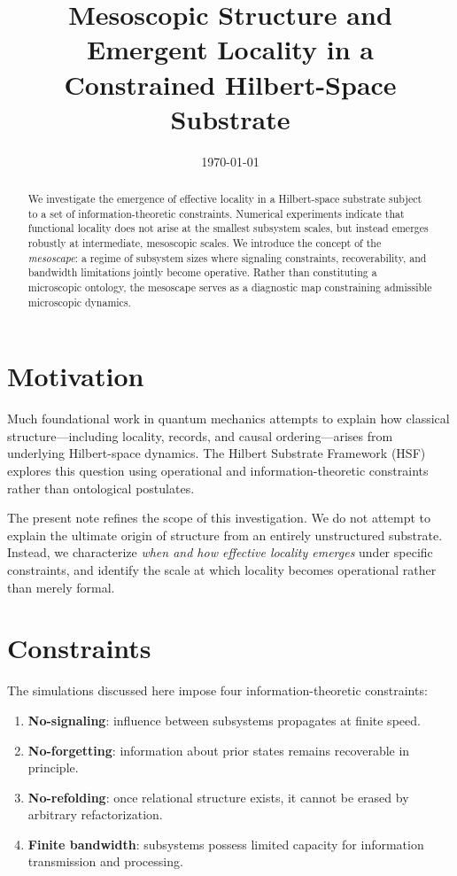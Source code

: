 \documentclass[11pt]{article}
\title{Mesoscopic Structure and Emergent Locality in a Constrained Hilbert-Space Substrate}
\author{ }
\date{\today}
\begin{document}
\maketitle

\begin{abstract}
We investigate the emergence of effective locality in a Hilbert-space substrate subject to a set of information-theoretic constraints. Numerical experiments indicate that functional locality does not arise at the smallest subsystem scales, but instead emerges robustly at intermediate, mesoscopic scales. We introduce the concept of the \emph{mesoscape}: a regime of subsystem sizes where signaling constraints, recoverability, and bandwidth limitations jointly become operative. Rather than constituting a microscopic ontology, the mesoscape serves as a diagnostic map constraining admissible microscopic dynamics.
\end{abstract}

\section{Motivation}

Much foundational work in quantum mechanics attempts to explain how classical structure---including locality, records, and causal ordering---arises from underlying Hilbert-space dynamics. The Hilbert Substrate Framework (HSF) explores this question using operational and information-theoretic constraints rather than ontological postulates.

The present note refines the scope of this investigation. We do not attempt to explain the ultimate origin of structure from an entirely unstructured substrate. Instead, we characterize \emph{when and how effective locality emerges} under specific constraints, and identify the scale at which locality becomes operational rather than merely formal.

\section{Constraints}

The simulations discussed here impose four information-theoretic constraints:

\begin{enumerate}
    \item \textbf{No-signaling}: influence between subsystems propagates at finite speed.
    \item \textbf{No-forgetting}: information about prior states remains recoverable in principle.
    \item \textbf{No-refolding}: once relational structure exists, it cannot be erased by arbitrary refactorization.
    \item \textbf{Finite bandwidth}: subsystems possess limited capacity for information transmission and processing.
\end{enumerate}
\end{document}
